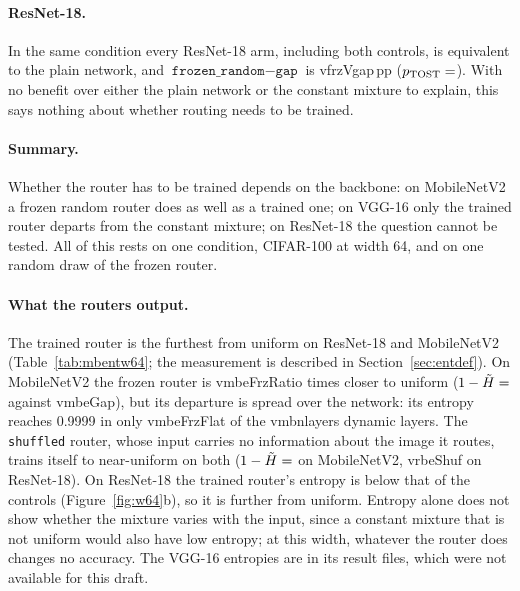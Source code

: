 \documentclass[10pt,a4paper]{article}
\newcommand{\V}[1]{\csname v#1\endcsname}
\begin{document}
\paragraph{ResNet-18.} In the same condition every ResNet-18 arm,
including both controls, is equivalent to the plain network, and
$\texttt{frozen\_random}-\texttt{gap}$ is \V{frzVgap}\,pp
($p_{\text{TOST}}=\V{frzVgapT}$). With no benefit over either the plain
network or the constant mixture to explain, this says nothing about
whether routing needs to be trained.

\paragraph{Summary.} Whether the router has to be trained depends on the
backbone: on MobileNetV2 a frozen random router does as well as a trained
one; on VGG-16 only the trained router departs from the constant mixture;
on ResNet-18 the question cannot be tested. All of this rests on one condition, CIFAR-100 at width 64, and
on one random draw of the frozen router.

\paragraph{What the routers output.} The trained router is the furthest
from uniform on ResNet-18 and MobileNetV2 (Table~\ref{tab:mbentw64}; the
measurement is described in Section~\ref{sec:entdef}). On MobileNetV2 the
frozen router is \V{mbeFrzRatio} times closer to uniform
($1-\tilde H=\V{mbeFrz}$ against \V{mbeGap}), but its departure is spread
over the network: its entropy reaches 0.9999 in only \V{mbeFrzFlat} of the
\V{mbnlayers} dynamic layers. The \texttt{shuffled} router, whose input
carries no information about the image it routes, trains itself to
near-uniform on both ($1-\tilde H=\V{mbeShuf}$ on MobileNetV2,
\V{rbeShuf} on ResNet-18). On ResNet-18 the trained router's entropy is
below that of the controls (Figure~\ref{fig:w64}b), so it is further from
uniform. Entropy alone does not show whether the mixture varies with the
input, since a constant mixture that is not uniform would also have low
entropy; at this width, whatever the router does changes no accuracy. The
VGG-16 entropies are in its result files, which were not available for
this draft.
\end{document}
